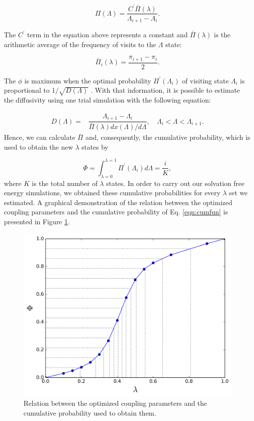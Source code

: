 \begin{equation}
\Pi (\Lambda) = \dfrac{C^{'} \bar{\Pi} (\lambda)}{\Lambda_{i+1} - \Lambda_{i}}.
\label{eqn:plambda}
\end{equation}

The $C^{'} $ term in the equation above represents a constant and $\bar{\Pi} (\lambda)$ is the arithmetic average of the frequency of visits to the $\Lambda$ state:

\begin{equation}
\bar{\Pi}_{i} (\lambda) = \dfrac{\pi_{i+1} - \pi_{i}}{2}.
\label{eqn:barplambda}
\end{equation}

The $\phi$ is maximum when the optimal probability $\Pi^{'}(\Lambda_{i})$ of visiting state $\Lambda_{i}$ is proportional to $1/\sqrt{D(\Lambda)}$ \cite{trebst2004}. With that information, it is possible to estimate the diffusivity using one trial simulation with the following equation:

\begin{equation}
\begin{aligned}
D(\Lambda) {}=& \dfrac{\Lambda_{i+1} - \Lambda_{i}}{\bar{\Pi} (\lambda) {dx(\Lambda)}/{d \Lambda}}, \quad \Lambda_{i} < \Lambda < \Lambda_{i+1}.
\end{aligned}
\label{eqn:diff}
\end{equation}    
Hence, we can calculate $\bar{\Pi} $ and, consequently, the cumulative probability, which is used to obtain the new $\lambda$ states by

\begin{equation}
\Phi = \int_{\lambda =0}^{\lambda =1} \Pi^{'}(\Lambda_{i}) d \Lambda = \dfrac{i}{K},
\label{eqn:cumfun}
\end{equation}
where $K$ is the total number of $\lambda$ states. In order to carry out our solvation free energy simulations, we obtained these cumulative probabilities for every $\lambda$ set we estimated. A graphical demonstration of the relation between the optimized coupling parameters and the cumulative probability of Eq. \ref{eqn:cumfun} is presented in Figure \ref{fig:optimized_cdfexeample}.

\begin{figure}[h]
	\centering
	\includegraphics[width=0.8\linewidth]{Figures/optimized_cdfexeample}
	\caption{Relation between the optimized coupling parameters and the cumulative probability used to obtain them.}
	\label{fig:optimized_cdfexeample}
\end{figure}
\FloatBarrier
